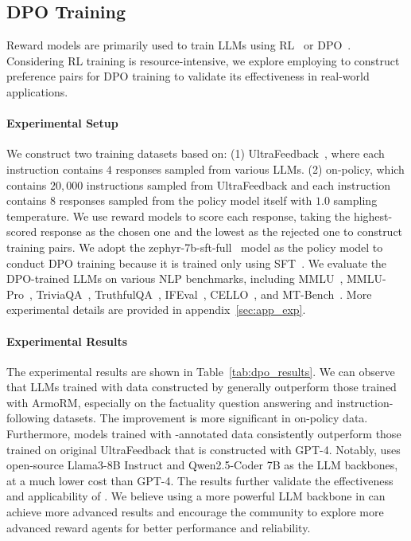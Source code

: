 \subsection{DPO Training}
\label{sec:dpo_train}
Reward models are primarily used to train LLMs using RL~\citep{ouyang2022training} or DPO~\citep{rafailov2024direct}. 
Considering RL training is resource-intensive, we explore employing \ourmethod to construct preference pairs for DPO training to validate its effectiveness in real-world applications.

\paragraph{Experimental Setup}
We construct two training datasets based on: (1) UltraFeedback~\citep{cui2024ultrafeedback}, where each instruction contains $4$ responses sampled from various LLMs. (2) on-policy, which contains $20,000$ instructions sampled from UltraFeedback and
each instruction contains $8$ responses sampled from the policy model itself with $1.0$ sampling temperature. We use reward models to score each response, taking the highest-scored response as the chosen one and the lowest as the rejected one to construct training pairs.
We adopt the zephyr-7b-sft-full~\citep{tunstall2023zephyr} model as the policy model to conduct DPO training because it is trained only using SFT~\citep{ouyang2022training}. We evaluate the DPO-trained LLMs on various NLP benchmarks, including MMLU~\citep{hendrycksmeasuring}, MMLU-Pro~\citep{wang2024mmlu}, TriviaQA~\citep{joshi2017triviaqa}, TruthfulQA~\citep{lin2022truthfulqa}, IFEval~\citep{zhou2023instruction}, CELLO~\citep{he2024can}, and MT-Bench~\citep{zheng2023judging}. More experimental details are provided in appendix~\ref{sec:app_exp}.



\paragraph{Experimental Results}

The experimental results are shown in Table~\ref{tab:dpo_results}. We can observe that LLMs trained with data constructed by \ourmethod generally outperform those trained with ArmoRM, especially on the factuality question answering and instruction-following datasets. The improvement is more significant in on-policy data.
Furthermore, models trained with \ourmethod-annotated data consistently outperform those trained on original UltraFeedback that is constructed with GPT-4. Notably, \ourmethodllama uses open-source Llama3-8B Instruct and Qwen2.5-Coder 7B as the LLM backbones, at a much lower cost than GPT-4.
The results further validate the effectiveness and applicability of \ourmethod. We believe using a more powerful LLM backbone in \ourmethod can achieve more advanced results and encourage the community to explore more advanced reward agents for better performance and reliability.
